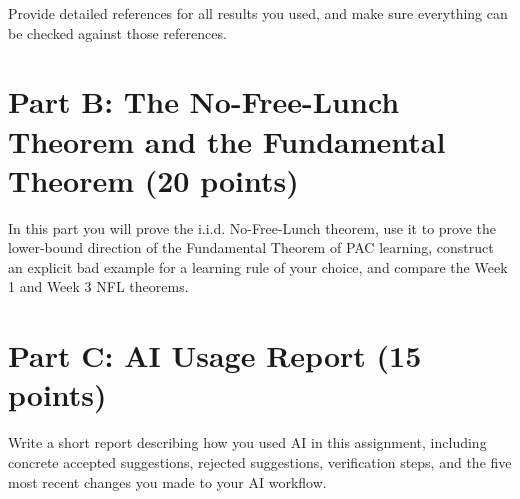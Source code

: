 \documentclass{article}
\begin{document}
Provide detailed references for all results you used, and make sure everything can be checked against those references.

\section{Part B: The No-Free-Lunch Theorem and the Fundamental Theorem (20 points)}

In this part you will prove the i.i.d. No-Free-Lunch theorem, use it to prove the lower-bound direction of the Fundamental Theorem of PAC learning, construct an explicit bad example for a learning rule of your choice, and compare the Week 1 and Week 3 NFL theorems.

\section{Part C: AI Usage Report (15 points)}

Write a short report describing how you used AI in this assignment, including concrete accepted suggestions, rejected suggestions, verification steps, and the five most recent changes you made to your AI workflow.
\end{document}
